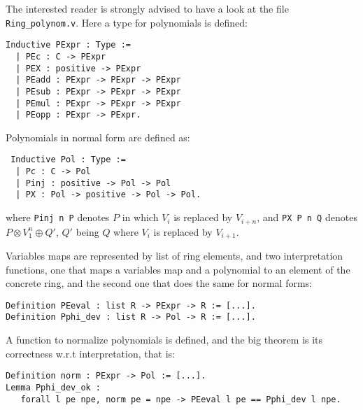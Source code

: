 The interested reader is strongly advised to have a look at the file
\texttt{Ring\_polynom.v}. Here a type for polynomials is defined: 

\begin{small}
\begin{flushleft}
\begin{verbatim}
Inductive PExpr : Type :=
  | PEc : C -> PExpr
  | PEX : positive -> PExpr
  | PEadd : PExpr -> PExpr -> PExpr
  | PEsub : PExpr -> PExpr -> PExpr
  | PEmul : PExpr -> PExpr -> PExpr
  | PEopp : PExpr -> PExpr.
\end{verbatim}
\end{flushleft}
\end{small}

Polynomials in normal form are defined as:
\begin{small}
\begin{flushleft}
\begin{verbatim}
 Inductive Pol : Type :=
  | Pc : C -> Pol 
  | Pinj : positive -> Pol -> Pol                   
  | PX : Pol -> positive -> Pol -> Pol.
\end{verbatim}
\end{flushleft}
\end{small}
where {\tt Pinj n P} denotes $P$ in which $V_i$ is replaced by
$V_{i+n}$, and {\tt PX P n Q} denotes $P \otimes V_1^{n} \oplus Q'$,
$Q'$ being $Q$ where $V_i$ is replaced by $V_{i+1}$. 


Variables maps are represented by list of ring elements, and two
interpretation functions, one that maps a variables map and a
polynomial to an element of the concrete ring, and the second one that
does the same for normal forms:
\begin{small}
\begin{flushleft}
\begin{verbatim}
Definition PEeval : list R -> PExpr -> R := [...].
Definition Pphi_dev : list R -> Pol -> R := [...].
\end{verbatim}
\end{flushleft}
\end{small}

A function to normalize polynomials is defined, and the big theorem is
its correctness w.r.t interpretation, that is:

\begin{small}
\begin{flushleft}
\begin{verbatim}
Definition norm : PExpr -> Pol := [...].
Lemma Pphi_dev_ok :
   forall l pe npe, norm pe = npe -> PEeval l pe == Pphi_dev l npe.
\end{verbatim}
\end{flushleft}
\end{small}

